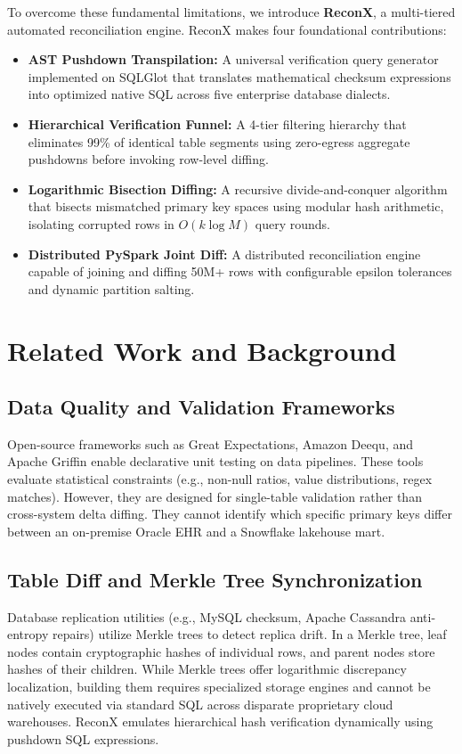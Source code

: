 \documentclass[10pt,journal,compsoc]{IEEEtran}
\begin{document}
To overcome these fundamental limitations, we introduce \textbf{ReconX}, a multi-tiered automated reconciliation engine. ReconX makes four foundational contributions:
\begin{itemize}
    \item \textbf{AST Pushdown Transpilation:} A universal verification query generator implemented on SQLGlot that translates mathematical checksum expressions into optimized native SQL across five enterprise database dialects.
    \item \textbf{Hierarchical Verification Funnel:} A 4-tier filtering hierarchy that eliminates 99\% of identical table segments using zero-egress aggregate pushdowns before invoking row-level diffing.
    \item \textbf{Logarithmic Bisection Diffing:} A recursive divide-and-conquer algorithm that bisects mismatched primary key spaces using modular hash arithmetic, isolating corrupted rows in $O(k \log M)$ query rounds.
    \item \textbf{Distributed PySpark Joint Diff:} A distributed reconciliation engine capable of joining and diffing 50M+ rows with configurable epsilon tolerances and dynamic partition salting.
\end{itemize}

\section{Related Work and Background}
\subsection{Data Quality and Validation Frameworks}
Open-source frameworks such as Great Expectations, Amazon Deequ, and Apache Griffin enable declarative unit testing on data pipelines. These tools evaluate statistical constraints (e.g., non-null ratios, value distributions, regex matches). However, they are designed for single-table validation rather than cross-system delta diffing. They cannot identify which specific primary keys differ between an on-premise Oracle EHR and a Snowflake lakehouse mart.

\subsection{Table Diff and Merkle Tree Synchronization}
Database replication utilities (e.g., MySQL checksum, Apache Cassandra anti-entropy repairs) utilize Merkle trees to detect replica drift. In a Merkle tree, leaf nodes contain cryptographic hashes of individual rows, and parent nodes store hashes of their children. While Merkle trees offer logarithmic discrepancy localization, building them requires specialized storage engines and cannot be natively executed via standard SQL across disparate proprietary cloud warehouses. ReconX emulates hierarchical hash verification dynamically using pushdown SQL expressions.
\end{document}
